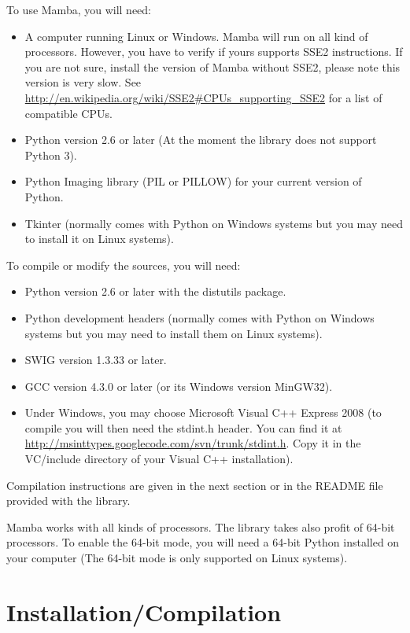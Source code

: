 \documentclass[a4paper,10pt,oneside]{article}
\begin{document}
To use Mamba, you will need:
\begin{itemize}
\item A computer running Linux or Windows. Mamba will run on all kind of 
processors. However, you have to verify if yours supports SSE2 instructions. If you
are not sure, install the version of Mamba without SSE2, please note this version
is very slow. See \url{http://en.wikipedia.org/wiki/SSE2#CPUs_supporting_SSE2}
for a list of compatible CPUs.
\item Python version 2.6 or later (At the moment the library does not support 
Python 3).
\item Python Imaging library (PIL or PILLOW) for your current version of Python.
\item Tkinter (normally comes with Python on Windows systems but you may need to
install it on Linux systems).
\end{itemize}

To compile or modify the sources, you will need:
\begin{itemize}
\item Python version 2.6 or later with the distutils package.
\item Python development headers (normally comes with Python on Windows systems 
but you may need to install them on Linux systems).
\item SWIG version 1.3.33 or later.
\item GCC version 4.3.0 or later (or its Windows version MinGW32).
\item  Under Windows, you may choose Microsoft Visual C++ Express 2008 (to 
compile you will then need the stdint.h header. You can find it at 
\url{http://msinttypes.googlecode.com/svn/trunk/stdint.h}. Copy it in the VC/include 
directory of your Visual C++ installation).
\end{itemize}
Compilation instructions are given in the next section or in the README file 
provided with the library.

Mamba works with all kinds of processors. The library takes also profit of 64-bit
processors. To enable the 64-bit mode, you will need a 64-bit Python installed 
on your computer (The 64-bit mode is only supported on Linux systems).

\pagebreak

\section{Installation/Compilation}
\label{cha:inst_comp}
\end{document}
